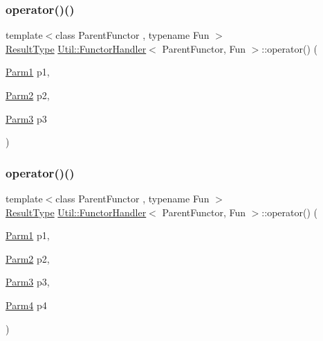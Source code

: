 \subsubsection{\texorpdfstring{operator()()}{operator()()}\hspace{0.1cm}{\footnotesize\ttfamily [12/18]}}
{\footnotesize\ttfamily template$<$class Parent\+Functor , typename Fun $>$ \\
\mbox{\hyperlink{classUtil_1_1FunctorHandler_a036da44b8cc2567704cebd2a20d16c80}{Result\+Type}} \mbox{\hyperlink{classUtil_1_1FunctorHandler}{Util\+::\+Functor\+Handler}}$<$ Parent\+Functor, Fun $>$\+::operator() (\begin{DoxyParamCaption}\item[{\mbox{\hyperlink{classUtil_1_1FunctorHandler_a0a902ba40a0ab746f1c29a81d68ae0db}{Parm1}}}]{p1,  }\item[{\mbox{\hyperlink{classUtil_1_1FunctorHandler_a5fb5374c316f8ac252aa22fcdf7d21a7}{Parm2}}}]{p2,  }\item[{\mbox{\hyperlink{classUtil_1_1FunctorHandler_a25f1b9dd7890c1dbc68abc686f30bec8}{Parm3}}}]{p3 }\end{DoxyParamCaption})\hspace{0.3cm}{\ttfamily [inline]}}

\mbox{\label{classUtil_1_1FunctorHandler_a2d310b7fe0c60af9889d0ac218406cd9}} 
\subsubsection{\texorpdfstring{operator()()}{operator()()}\hspace{0.1cm}{\footnotesize\ttfamily [13/18]}}
{\footnotesize\ttfamily template$<$class Parent\+Functor , typename Fun $>$ \\
\mbox{\hyperlink{classUtil_1_1FunctorHandler_a036da44b8cc2567704cebd2a20d16c80}{Result\+Type}} \mbox{\hyperlink{classUtil_1_1FunctorHandler}{Util\+::\+Functor\+Handler}}$<$ Parent\+Functor, Fun $>$\+::operator() (\begin{DoxyParamCaption}\item[{\mbox{\hyperlink{classUtil_1_1FunctorHandler_a0a902ba40a0ab746f1c29a81d68ae0db}{Parm1}}}]{p1,  }\item[{\mbox{\hyperlink{classUtil_1_1FunctorHandler_a5fb5374c316f8ac252aa22fcdf7d21a7}{Parm2}}}]{p2,  }\item[{\mbox{\hyperlink{classUtil_1_1FunctorHandler_a25f1b9dd7890c1dbc68abc686f30bec8}{Parm3}}}]{p3,  }\item[{\mbox{\hyperlink{classUtil_1_1FunctorHandler_a2e8ca7556b379684e9b76029e77dd644}{Parm4}}}]{p4 }\end{DoxyParamCaption})\hspace{0.3cm}{\ttfamily [inline]}}

